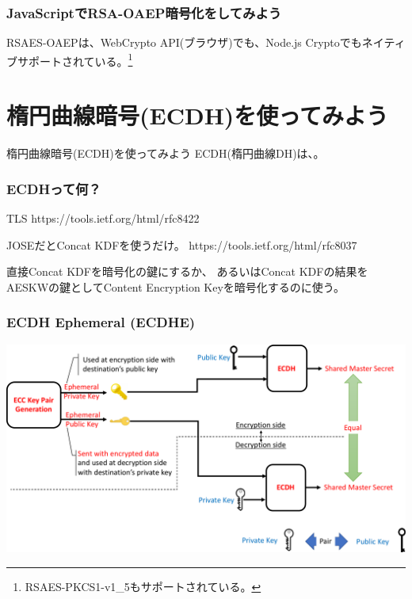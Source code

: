 \documentclass[12pt,dvipdfmx]{beamer}
\begin{document}
\begin{frame}
\frametitle{JavaScriptでRSA-OAEP暗号化をしてみよう}
RSAES-OAEPは、WebCrypto API(ブラウザ)でも、Node.js Cryptoでもネイティブサポートされている。\footnote[frame]{\scriptsize RSAES-PKCS1-v1\_5もサポートされている。}

\end{frame}

\begin{frame}
\end{frame}


\section{楕円曲線暗号(ECDH)を使ってみよう}
\begin{frame}
\centering
{\Large 楕円曲線暗号(ECDH)を使ってみよう}
ECDH(楕円曲線DH)は、。
\end{frame}

\begin{frame}
\frametitle{ECDHって何？}
TLS https://tools.ietf.org/html/rfc8422

JOSEだとConcat KDFを使うだけ。
https://tools.ietf.org/html/rfc8037

直接Concat KDFを暗号化の鍵にするか、
あるいはConcat KDFの結果をAESKWの鍵としてContent Encryption Keyを暗号化するのに使う。

\end{frame}

\begin{frame}
\frametitle{ECDH Ephemeral (ECDHE)}
\begin{center}
\includegraphics[width=\linewidth]{Figs/ecdh01.pdf}
\end{center}
\end{frame}
\end{document}
